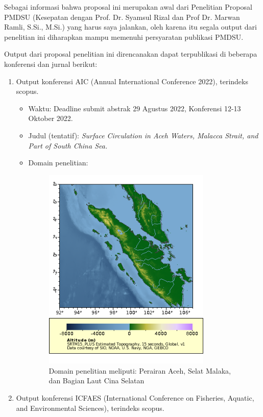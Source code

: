 \vspace{1.5pc}
\begin{spacing}{1.5}
	Sebagai informasi bahwa proposal ini merupakan awal dari Penelitian Proposal PMDSU (Kesepatan dengan Prof. Dr. Syamsul Rizal dan Prof Dr. Marwan Ramli, S.Si., M.Si.) yang harus saya jalankan, oleh karena itu segala output dari penelitian ini diharapkan mampu memenuhi persyaratan publikasi PMDSU. 
	
	Output dari proposal penelitian ini direncanakan dapat terpublikasi di beberapa konferensi dan jurnal berikut:
	\begin{enumerate}
		\item Output konferensi AIC (Annual International Conference 2022), terindeks scopus.
		\begin{itemize}
			\item Waktu: Deadline submit abstrak 29 Agustus 2022, Konferensi 12-13 Oktober 2022.
			\item Judul (tentatif): \textit{Surface Circulation in Aceh Waters, Malacca Strait, and Part of South China Sea.}
			\item Domain penelitian:
			\begin{figure}[H]
				\centering
				\includegraphics[width=8cm]{contents/srtm15plus}
				\caption{Domain penelitian meliputi: Perairan Aceh, Selat Malaka, dan Bagian Laut Cina Selatan}
			\end{figure}
		\end{itemize}
		\item Output konferensi ICFAES (International Conference on Fisheries, Aquatic, and Environmental Sciences), terindeks scopus.
		\begin{itemize}

\end{itemize}
\end{enumerate}
\end{spacing}
